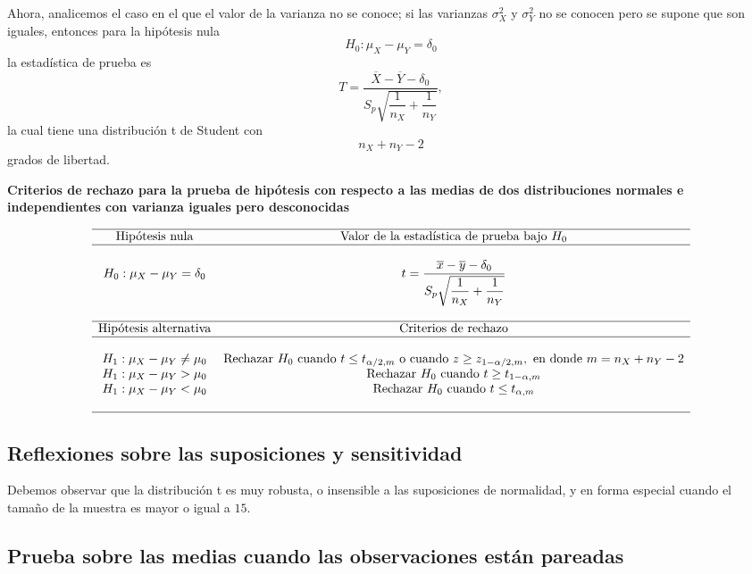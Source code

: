 Ahora, analicemos el caso en el que el valor de la varianza no se conoce; si las varianzas $\sigma_X^2$ y $\sigma_Y^2$ no se conocen pero se supone que son iguales, entonces para la hipótesis nula
$$H_0:\mu_X-\mu_Y=\delta_0$$
la estadística de prueba es
$$T=\dfrac{\overline{X}-\overline{Y}-\delta_0}{S_p\sqrt{\dfrac{1}{n_X}+\dfrac{1}{n_Y}}},$$
la cual tiene una distribución t de Student con $$n_X+n_Y-2$$ grados de libertad. 

\begin{center}
\textbf{Criterios de rechazo para la prueba de hipótesis con respecto a las medias de dos distribuciones normales e independientes con varianza iguales pero desconocidas}
\end{center}
$$
\begin{array}{cc}
    \hline
    \mbox{Hipótesis nula} & \mbox{Valor de la estadística de prueba bajo } H_0\\
    \hline\\
    H_0: \mu_X-\mu_Y=\delta_0 & t=\dfrac{\overline{x}-\overline{y}-\delta_0}{S_p \sqrt{\dfrac{1}{n_X}+\dfrac{1}{n_Y}}}\\\\
    \hline
    \mbox{Hipótesis alternativa} & \mbox{Criterios de rechazo}\\
    \hline\\
    H_1:\mu_X-\mu_Y\neq \mu_0 & \mbox{Rechazar } H_0 \mbox{ cuando } t\leq t_{\alpha/2,m} \mbox{ o cuando } z\geq z_{1-\alpha/2,m}, \mbox{ en donde } m=n_X+n_Y-2\\
    H_1:\mu_X-\mu_Y> \mu_0 & \mbox{Rechazar } H_0 \mbox{ cuando } t\geq t_{1-\alpha,m}\\
    H_1:\mu_X-\mu_Y< \mu_0 & \mbox{Rechazar } H_0 \mbox{ cuando } t\leq t_{\alpha,m}\\\\
    \hline
\end{array}
$$

\subsection{Reflexiones sobre las suposiciones y sensitividad}
Debemos observar que la distribución t es muy robusta, o insensible a las suposiciones de normalidad, y en forma especial cuando el tamaño de la muestra es mayor o igual a $15$.

\subsection{Prueba sobre las medias cuando las observaciones están pareadas}
